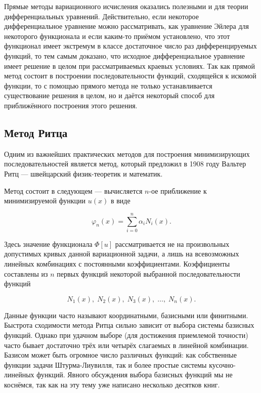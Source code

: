 \documentclass{article}
\begin{document}
Прямые методы вариационного исчисления оказались полезными и для теории дифференциальных уравнений. Действительно, если некоторое дифференциальное уравнение можно рассматривать, как уравнение Эйлера для некоторого функционала и если каким-то приёмом установлено, что этот функционал имеет экстремум в классе достаточное число раз дифференцируемых функций, то тем самым доказано, что исходное дифференциальное уравнение имеет решение в целом при рассматриваемых краевых условиях. Так как прямой метод состоит в построении последовательности функций, сходящейся к искомой функции, то с помощью прямого метода не только устанавливается существование решения в целом, но и даётся некоторый способ для приближённого построения этого решения.


\subsection{Метод Ритца}

Одним из важнейших практических методов для построения минимизирующих последовательностей является метод, который предложил в 1908 году Вальтер Ритц --- швейцарский физик-теоретик и математик.

Метод состоит в следующем --- вычисляется $n$-ое приближение к минимизируемой функции $u(x)$ в виде

\begin{equation}\label{approx_func}
	\varphi_{n}(x) = \sum_{i=0}^n \alpha_{i} N_{i}(x).
\end{equation}

\noindent Здесь значение функционала $\Phi[u]$ рассматривается не на произвольных допустимых кривых данной вариационной задачи, а лишь на всевозможных линейных комбинациях с постоянными коэффициентами. Коэффициенты составлены из $n$ первых функций некоторой выбранной последовательности функций

\begin{displaymath}
	N_{1}(x), \; N_{2}(x), \; N_{3}(x), \; \ldots, \; N_{n}(x).
\end{displaymath}

\begin{info}
	Данные функции часто называют координатными, базисными или финитными. Быстрота сходимости метода Ритца сильно зависит от выбора системы базисных функций. Однако при удачном выборе (для достижения приемлемой точности) часто бывает достаточно трёх или четырёх слагаемых в линейной комбинации. Базисом может быть огромное число различных функций: как собственные функции задачи Штурма-Лиувилля, так и более простые системы кусочно-линейных функций. Явного обсуждения выбора базисных функций мы не коснёмся, так как на эту тему уже написано несколько десятков книг.
\end{info}
\end{document}
